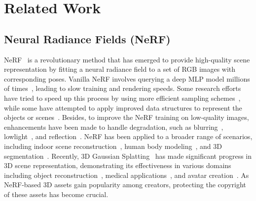 \section{Related Work}
\subsection{Neural Radiance Fields (NeRF)}
NeRF~\cite{nerf2020} is a revolutionary method that has emerged to provide high-quality scene representation by fitting a neural radiance field to a set of RGB images with corresponding poses. Vanilla NeRF involves querying a deep MLP model millions of times~\cite{reiser2021kilonerf}, leading to slow training and rendering speeds. Some research efforts have tried to speed up this process by using more efficient sampling schemes~\cite{piala2021terminerf, 10328666, verbin2024ref}, while some have attempted to apply improved data structures to represent the objects or scenes~\cite{10478788, muller2022instant, sun2022direct, fridovich2022plenoxels, chen2022tensorf}. Besides, to improve the NeRF training on low-quality images, enhancements have been made to handle degradation, such as blurring~\cite{ma2022deblur, wang2023bad, qi2023e2nerf, zhou2023nerflix}, lowlight~\cite{wang2023lighting}, and reflection~\cite{guo2022nerfren, zhu2022neural}. NeRF has been applied to a broader range of scenarios, including indoor scene reconstruction~\cite{10496207, wei2023depth, chen2023structnerf, yang2023nerfvs}, human body modeling~\cite{gao2022mps, peng2024animatable}, and 3D segmentation~\cite{cen2023segment, cen2023segment_pami, liu2024sanerf}. Recently, 3D Gaussian Splatting~\cite{kerbl3Dgaussians} has made significant progress in 3D scene representation, demonstrating its effectiveness in various domains including object reconstruction~\cite{charatan2024pixelsplat, chen2024liftimage3d}, medical applications~\cite{wang2024endogslam, li2024endosparse}, and avatar creation~\cite{qian20243dgs, zhao2024chase, zhao2024sg}. 
As NeRF-based 3D assets gain popularity among creators, protecting the copyright of these assets has become crucial.


